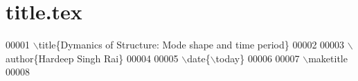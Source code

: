 \hypertarget{title_8tex_source}{}\section{title.\+tex}
\label{title_8tex_source}

\begin{DoxyCode}
00001 \(\backslash\)title\{Dymanics of Structure: Mode shape and time period\}
00002 
00003 \(\backslash\)author\{Hardeep Singh Rai\}
00004 
00005 \(\backslash\)date\{\(\backslash\)today\}
00006 
00007 \(\backslash\)maketitle
00008 
\end{DoxyCode}
